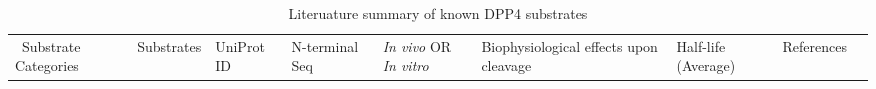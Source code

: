 \begin{table*} 
\caption {Literuature summary of known DPP4 substrates}
\label{DPP4-Sub}

\begin{tabular}{|l|l|l|l|l|l|l|l|l|}
    \hline
    \ Substrate Categories & Substrates & UniProt ID & N-terminal Seq & \textit{In vivo} OR \textit{In vitro} & Biophysiological effects upon cleavage & Half-life (Average) & References
    \hline
\end{tabular}
\end{table*}